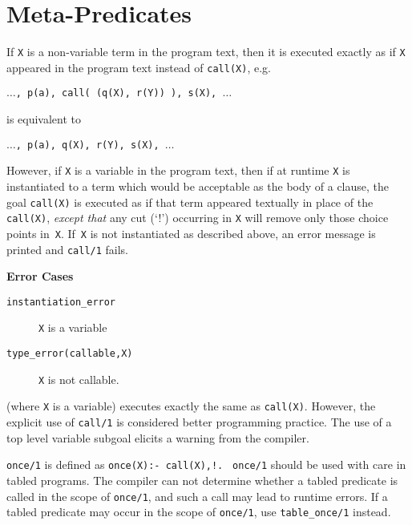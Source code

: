 \section{Meta-Predicates} \label{meta_predicates}
\begin{description}
    If {\tt X} is a non-variable term in the program text, then it is 
    executed exactly as if {\tt X} appeared in the program text instead 
    of {\tt call(X)},
    e.g.
    \begin{center}
        {\tt $\ldots$, p(a), call( (q(X), r(Y)) ), s(X), $\ldots$}
    \end{center}
    is equivalent to
    \begin{center}
        {\tt $\ldots$, p(a), q(X), r(Y), s(X), $\ldots$}
    \end{center}
    However, if {\tt X} is a variable in the program text,
    then if at runtime {\tt X} is instantiated to a term which 
    would be acceptable as the body of a clause, the goal 
    {\tt call(X)} is executed as if that
    term appeared textually in place of the {\tt call(X)},
    {\em except that} any cut (`!')
    occurring in {\tt X} will remove only those choice points in~{\tt X}.
    If~{\tt X} is not instantiated as described above,
    an error message is printed and {\tt call/1} fails.

{\bf Error Cases}
    \begin{description}
    \item[{\tt instantiation\_error}]
	{\tt X} is a variable
     \item[{\tt type\_error(callable,X)}]
	{\tt X} is not callable.
    \end{description}

    (where {\tt X} is a variable) executes exactly the same as 
    {\tt call(X)}.
    However, the explicit use of {\tt call/1} is considered better
    programming practice.  The use of a top level variable subgoal
    elicits a warning from the compiler.

    {\tt once/1} is defined as {\tt once(X):- call(X),!.}  {\tt
    once/1} should be used with care in tabled programs.  The compiler
    can not determine whether a tabled predicate is called in the
    scope of {\tt once/1}, and such a call may lead to runtime errors.
    If a tabled predicate may occur in the scope of {\tt once/1}, use
    {\tt table\_once/1} instead.


\end{description}

